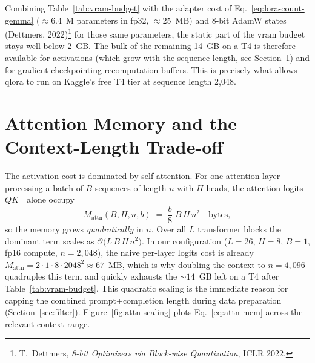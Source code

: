 \documentclass[12pt, a4paper]{report}
\begin{document}
Combining Table~\ref{tab:vram-budget} with the adapter cost of
Eq.~\eqref{eq:lora-count-gemma} (\(\approx 6.4\)~M parameters in fp32,
\(\approx 25\)~MB) and 8-bit AdamW states
(Dettmers, 2022)\footnote{T.~Dettmers, \emph{8-bit Optimizers via
Block-wise Quantization}, ICLR 2022.} for those same parameters, the
static part of the \gls{vram} budget stays well below 2~GB. The bulk of
the remaining 14~GB on a T4 is therefore available for activations
(which grow with the sequence length, see
Section~\ref{sec:attn-memory}) and for gradient-checkpointing
recomputation buffers. This is precisely what allows \gls{qlora} to
run on Kaggle's free T4 tier at sequence length 2{,}048.

\section{Attention Memory and the Context-Length Trade-off}
\label{sec:attn-memory}

The activation cost is dominated by self-attention. For one attention
layer processing a batch of \(B\) sequences of length \(n\) with \(H\)
heads, the attention logits \(Q K^{\top}\) alone occupy
\begin{equation}
  M_{\mathrm{attn}}(B, H, n, b)
    \;=\; \frac{b}{8}\;B\,H\,n^{2}\quad\text{bytes},
  \label{eq:attn-mem}
\end{equation}
so the memory grows \emph{quadratically} in \(n\). Over all \(L\)
transformer blocks the dominant term scales as
\(\mathcal{O}\bigl(L\,B\,H\,n^{2}\bigr)\). In our configuration
(\(L=26\), \(H=8\), \(B=1\), fp16 compute, \(n=2{,}048\)), the naive
per-layer logits cost is already
\(M_{\mathrm{attn}} = 2 \cdot 1 \cdot 8 \cdot 2048^{2} \approx 67\)~MB,
which is why doubling the context to \(n=4{,}096\) quadruples this term
and quickly exhausts the \(\sim\!14\)~GB left on a T4 after
Table~\ref{tab:vram-budget}. This quadratic scaling is the immediate
reason for capping the combined prompt+completion length during data
preparation (Section~\ref{sec:filter}). Figure~\ref{fig:attn-scaling}
plots Eq.~\eqref{eq:attn-mem} across the relevant context range.
\end{document}
